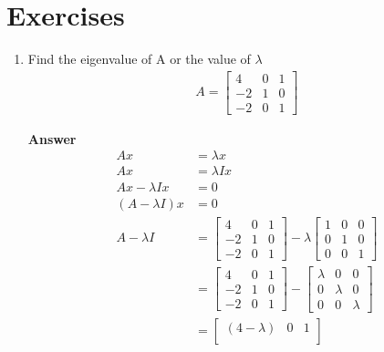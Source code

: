\documentclass[12pt,titlepage]{article}
\begin{document}
\section{Exercises}
\begin{enumerate}
    \item {
        Find the eigenvalue of A or the value of $\lambda$
        \begin{align*}
            A = \begin{bmatrix}
                 4 & 0 & 1 \\
                -2 & 1 & 0 \\
                -2 & 0 & 1
            \end{bmatrix}
        \end{align*}

        \textbf{Answer}
        \begin{align*}
            Ax &= \lambda x \\
            Ax &= \lambda I x \\
            Ax - \lambda I x &= 0 \\
            (A - \lambda I) x &= 0 \\
            A - \lambda I &= \begin{bmatrix}
                4 & 0 & 1 \\
                -2 & 1 & 0 \\
                -2 & 0 & 1
            \end{bmatrix} - \lambda \begin{bmatrix}
                1 & 0 & 0 \\
                0 & 1 & 0 \\
                0 & 0 & 1
            \end{bmatrix} \\
            &= \begin{bmatrix}
                4 & 0 & 1 \\
                -2 & 1 & 0 \\
                -2 & 0 & 1
            \end{bmatrix} - \begin{bmatrix}
                \lambda & 0 & 0 \\
                0 & \lambda & 0 \\
                0 & 0 & \lambda
            \end{bmatrix} \\
            &= \begin{bmatrix}
                (4 - \lambda) & 0 & 1 \\

\end{bmatrix}
\end{align*}}
\end{enumerate}
\end{document}
